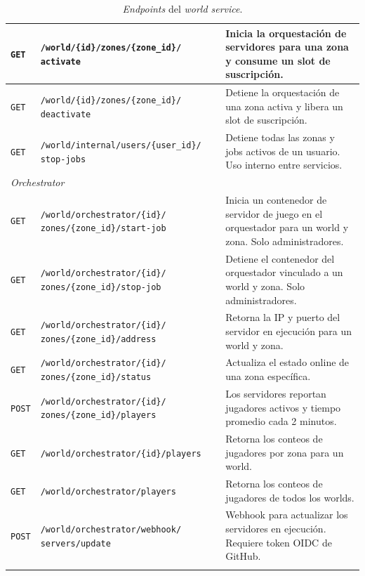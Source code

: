 \begin{longtable}{|p{2cm}|p{7cm}|p{5.5cm}|}
\hline
\texttt{GET}    & \texttt{/world/\{id\}/zones/\{zone\_id\}/} \newline \texttt{activate}   & Inicia la orquestación de servidores para una zona y consume un slot de suscripción. \\
\hline
\texttt{GET}    & \texttt{/world/\{id\}/zones/\{zone\_id\}/} \newline \texttt{deactivate} & Detiene la orquestación de una zona activa y libera un slot de suscripción. \\
\hline
\texttt{GET}    & \texttt{/world/internal/users/\{user\_id\}/} \newline \texttt{stop-jobs} & Detiene todas las zonas y jobs activos de un usuario. Uso interno entre servicios. \\
\hline
\multicolumn{3}{|l|}{\textit{Orchestrator}} \\
\hline
\texttt{GET}    & \texttt{/world/orchestrator/\{id\}/} \newline \texttt{zones/\{zone\_id\}/start-job} & Inicia un contenedor de servidor de juego en el orquestador para un world y zona. Solo administradores. \\
\hline
\texttt{GET}    & \texttt{/world/orchestrator/\{id\}/} \newline \texttt{zones/\{zone\_id\}/stop-job}  & Detiene el contenedor del orquestador vinculado a un world y zona. Solo administradores. \\
\hline
\texttt{GET}    & \texttt{/world/orchestrator/\{id\}/} \newline \texttt{zones/\{zone\_id\}/address}   & Retorna la IP y puerto del servidor en ejecución para un world y zona. \\
\hline
\texttt{GET}    & \texttt{/world/orchestrator/\{id\}/} \newline \texttt{zones/\{zone\_id\}/status}    & Actualiza el estado online de una zona específica. \\
\hline
\texttt{POST}   & \texttt{/world/orchestrator/\{id\}/} \newline \texttt{zones/\{zone\_id\}/players}   & Los servidores reportan jugadores activos y tiempo promedio cada 2 minutos. \\
\hline
\texttt{GET}    & \texttt{/world/orchestrator/\{id\}/players}    & Retorna los conteos de jugadores por zona para un world. \\
\hline
\texttt{GET}    & \texttt{/world/orchestrator/players}           & Retorna los conteos de jugadores de todos los worlds. \\
\hline
\texttt{POST}   & \texttt{/world/orchestrator/webhook/} \newline \texttt{servers/update} & Webhook para actualizar los servidores en ejecución. Requiere token OIDC de GitHub. \\
\hline
\caption{\textit{Endpoints} del \textit{world service}.}\label{tab:world-endpoints}
\end{longtable}
